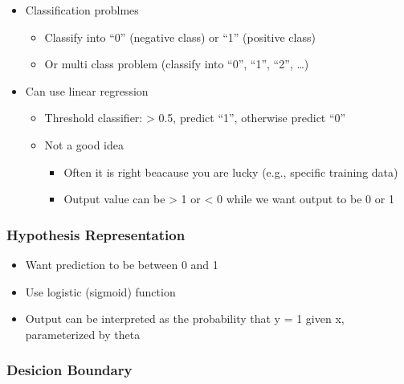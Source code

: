 \documentclass[]{article}
\providecommand{\tightlist}{%
  \setlength{\itemsep}{0pt}\setlength{\parskip}{0pt}}
\begin{document}
\begin{itemize}
\tightlist
\item
  Classification problmes

  \begin{itemize}
  \tightlist
  \item
    Classify into ``0'' (negative class) or ``1'' (positive class)
  \item
    Or multi class problem (classify into ``0'', ``1'', ``2'', \ldots{})
  \end{itemize}
\item
  Can use linear regression

  \begin{itemize}
  \tightlist
  \item
    Threshold classifier: \textgreater{} 0.5, predict ``1'', otherwise
    predict ``0''
  \item
    Not a good idea

    \begin{itemize}
    \tightlist
    \item
      Often it is right beacause you are lucky (e.g., specific training
      data)
    \item
      Output value can be \textgreater{} 1 or \textless{} 0 while we
      want output to be 0 or 1
    \end{itemize}
  \end{itemize}
\end{itemize}

\hypertarget{hypothesis-representation}{%
\subsubsection{Hypothesis
Representation}\label{hypothesis-representation}}

\begin{itemize}
\tightlist
\item
  Want prediction to be between 0 and 1
\item
  Use logistic (sigmoid) function
\end{itemize}

\begin{itemize}
\tightlist
\item
  Output can be interpreted as the probability that y = 1 given x,
  parameterized by theta
\end{itemize}

\hypertarget{desicion-boundary}{%
\subsubsection{Desicion Boundary}\label{desicion-boundary}}
\end{document}
